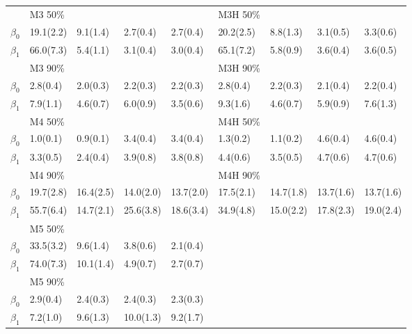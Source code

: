 \documentclass[12pt]{article}
\begin{document}
\begin{center}
\begin{table}[h]
\begin{tabular}[tb]{cllllllll}
          & M3 50\%   &           &           &           & M3H 50\%  &           &           &           \\
$\beta_0$ & 19.1(2.2) & 9.1(1.4)  & 2.7(0.4)  & 2.7(0.4)  & 20.2(2.5) & 8.8(1.3)  & 3.1(0.5)  & 3.3(0.6)  \\
$\beta_1$ & 66.0(7.3) & 5.4(1.1)  & 3.1(0.4)  & 3.0(0.4)  & 65.1(7.2) & 5.8(0.9)  & 3.6(0.4)  & 3.6(0.5)  \\
          & M3 90\%   &           &           &           & M3H 90\%  &           &           &           \\
$\beta_0$ & 2.8(0.4)  & 2.0(0.3)  & 2.2(0.3)  & 2.2(0.3)  & 2.8(0.4)  & 2.2(0.3)  & 2.1(0.4)  & 2.2(0.4)  \\
$\beta_1$ & 7.9(1.1)  & 4.6(0.7)  & 6.0(0.9)  & 3.5(0.6)  & 9.3(1.6)  & 4.6(0.7)  & 5.9(0.9)  & 7.6(1.3)  \\
          & M4 50\%   &           &           &           & M4H 50\%  &           &           &           \\
$\beta_0$ & 1.0(0.1)  & 0.9(0.1)  & 3.4(0.4)  & 3.4(0.4)  & 1.3(0.2)  & 1.1(0.2)  & 4.6(0.4)  & 4.6(0.4)  \\
$\beta_1$ & 3.3(0.5)  & 2.4(0.4)  & 3.9(0.8)  & 3.8(0.8)  & 4.4(0.6)  & 3.5(0.5)  & 4.7(0.6)  & 4.7(0.6)  \\
          & M4 90\%   &           &           &           & M4H 90\%  &           &           &           \\
$\beta_0$ & 19.7(2.8) & 16.4(2.5) & 14.0(2.0) & 13.7(2.0) & 17.5(2.1) & 14.7(1.8) & 13.7(1.6) & 13.7(1.6) \\
$\beta_1$ & 55.7(6.4) & 14.7(2.1) & 25.6(3.8) & 18.6(3.4) & 34.9(4.8) & 15.0(2.2) & 17.8(2.3) & 19.0(2.4) \\
          & M5 50\%   &           &           &           &           &           &           &           \\
$\beta_0$ & 33.5(3.2) & 9.6(1.4)  & 3.8(0.6)  & 2.1(0.4)  &           &           &           &           \\
$\beta_1$ & 74.0(7.3) & 10.1(1.4) & 4.9(0.7)  & 2.7(0.7)  &           &           &           &           \\
          & M5 90\%   &           &           &           &           &           &           &           \\
$\beta_0$ & 2.9(0.4)  & 2.4(0.3)  & 2.4(0.3)  & 2.3(0.3)  &           &           &           &           \\
$\beta_1$ & 7.2(1.0)  & 9.6(1.3)  & 10.0(1.3) & 9.2(1.7)  &           &           &           &           \\
\hline
    \end{tabular}
    \label{ch2:tab:m1}
  \end{table}
\end{center}
\end{document}
